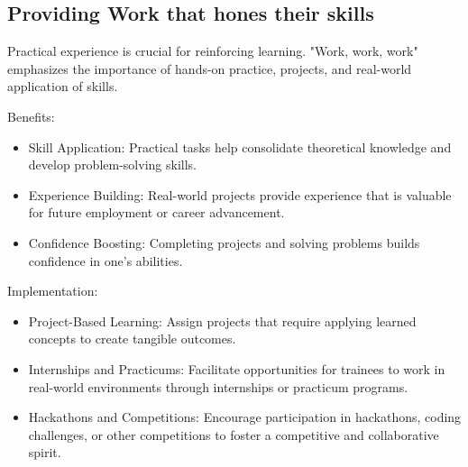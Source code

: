 \subsection{Providing Work that hones their skills}


Practical experience is crucial for reinforcing learning. "Work, work, work" emphasizes the importance of hands-on practice, projects, and real-world application of skills.

Benefits:
\begin{itemize}
    \item Skill Application: Practical tasks help consolidate theoretical knowledge and develop problem-solving skills.
    \item Experience Building: Real-world projects provide experience that is valuable for future employment or career advancement.
    \item Confidence Boosting: Completing projects and solving problems builds confidence in one’s abilities.
\end{itemize}
Implementation:
\begin{itemize}
    \item Project-Based Learning: Assign projects that require applying learned concepts to create tangible outcomes.
    \item Internships and Practicums: Facilitate opportunities for trainees to work in real-world environments through internships or practicum programs.
    \item Hackathons and Competitions: Encourage participation in hackathons, coding challenges, or other competitions to foster a competitive and collaborative spirit.
\end{itemize}    
    
